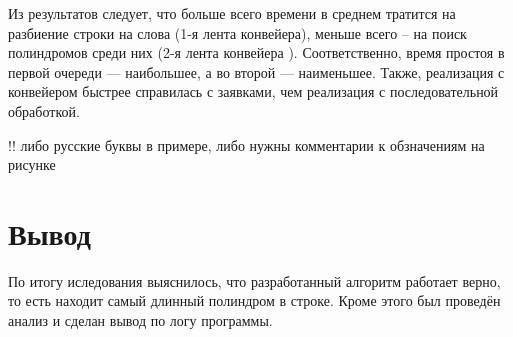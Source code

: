 \newpage
Из результатов следует, что больше всего  времени в среднем тратится на разбиение строки на слова (1-я лента конвейера), меньше всего -- на поиск полиндромов среди них (2-я лента конвейера
). Соответственно, время простоя в первой очереди --- наибольшее, а во второй --- наименьшее. Также, реализация с конвейером быстрее справилась с заявками, чем реализация с последовательной обработкой.

!! либо русские буквы в примере, либо нужны комментарии к обзначениям на рисунке

\section{Вывод}
По итогу иследования выяснилось, что разработанный алгоритм работает верно, то есть находит самый длинный полиндром в строке. Кроме этого был проведён анализ и сделан вывод по логу программы.